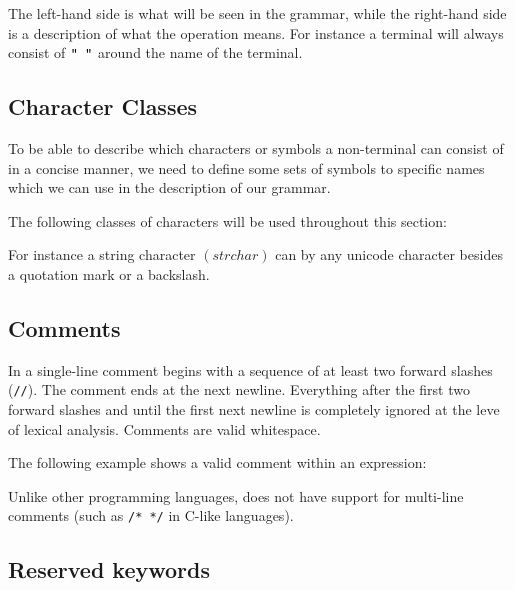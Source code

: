 The left-hand side is what will be seen in the grammar, while the right-hand
side is a description of what the operation means. For instance  a terminal will
always consist of $\texttt{" "}$ around the name of the terminal.

\subsection{Character Classes}
To be able to describe which characters or symbols a non-terminal can consist of
in a concise manner, we need to define some sets of symbols to specific names
which we can use in the description of our grammar.

The following classes of characters will be used throughout this section:

\begin{ebnf}
\end{ebnf}

For instance a string character $\left(strchar\right)$ can by any
unicode character besides a quotation mark or a backslash. 

\subsection{Comments}

In \productname{} a single-line comment begins with a sequence of at least two
forward slashes (\texttt{//}). The comment ends at the next newline. Everything
after the first two forward slashes and until the first next newline is
completely ignored at the leve of lexical analysis. Comments are valid
whitespace.

The following example shows a valid comment within an expression:


Unlike other programming languages, \productname{} does not have support for
multi-line comments (such as \texttt{/* */} in C-like languages).

\subsection{Reserved keywords}


